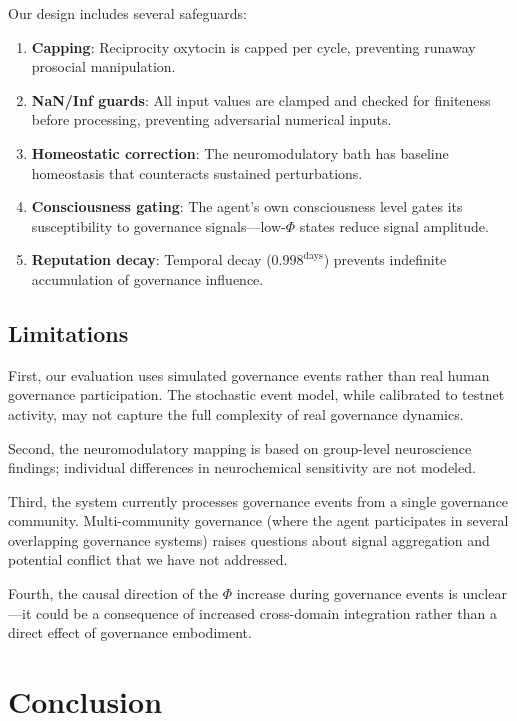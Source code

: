 \documentclass[11pt,a4paper]{article}
\begin{document}
Our design includes several safeguards:
\begin{enumerate}
  \item \textbf{Capping}: Reciprocity oxytocin is capped per cycle, preventing runaway prosocial manipulation.
  \item \textbf{NaN/Inf guards}: All input values are clamped and checked for finiteness before processing, preventing adversarial numerical inputs.
  \item \textbf{Homeostatic correction}: The neuromodulatory bath has baseline homeostasis that counteracts sustained perturbations.
  \item \textbf{Consciousness gating}: The agent's own consciousness level gates its susceptibility to governance signals---low-$\Phi$ states reduce signal amplitude.
  \item \textbf{Reputation decay}: Temporal decay ($0.998^{\text{days}}$) prevents indefinite accumulation of governance influence.
\end{enumerate}

\subsection{Limitations}

First, our evaluation uses simulated governance events rather than real human governance participation.
The stochastic event model, while calibrated to testnet activity, may not capture the full complexity of real governance dynamics.

Second, the neuromodulatory mapping is based on group-level neuroscience findings; individual differences in neurochemical sensitivity are not modeled.

Third, the system currently processes governance events from a single governance community.
Multi-community governance (where the agent participates in several overlapping governance systems) raises questions about signal aggregation and potential conflict that we have not addressed.

Fourth, the causal direction of the $\Phi$ increase during governance events is unclear---it could be a consequence of increased cross-domain integration rather than a direct effect of governance embodiment.

\section{Conclusion}
\label{sec:conclusion}
\end{document}
